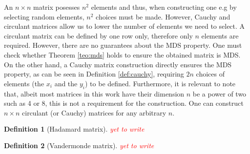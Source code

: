 \documentclass{report}
\newtheorem{definition}{Definition}{\bfseries}{\itshape}
\begin{document}
An $n\times n$ matrix posesses $n^2$ elements and thus, when constructing one e.g by selecting random elements, $n^2$ choices must be made. However, Cauchy and circulant matrices allow us to lower the number of elements we need to select. A circulant matrix can be defined by one row only, therefore only $n$ elements are required. However, there are no guarantees about the MDS property. One must check whether Theorem \ref{teo:mds} holds to ensure the obtained matrix is MDS. On the other hand, a Cauchy matrix construction directly ensures the MDS property, as can be seen in Definition \ref{def:cauchy}, requiring $2n$ choices of elements (the $x_i$ and the $y_i$) to be defined. Furthermore, it is relevant to note that, albeit most matrices in this work have their dimension $n$ be a power of two such as 4 or 8, this is not a requirement for the construction. One can construct $n \times n$ circulant (or Cauchy) matrices for any arbitrary $n$.

\begin{definition}[Hadamard matrix]
\textcolor{red}{yet to write}
\end{definition}

\begin{definition}[Vandermonde matrix]
\textcolor{red}{yet to write}
\end{definition}


\end{document}
